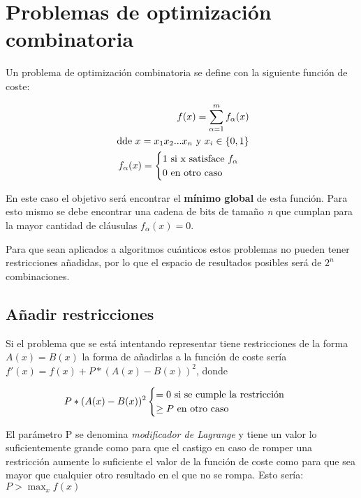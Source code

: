 \section{Problemas de optimización combinatoria}
\label{sec:3-problemas de optimizacion combinatoria}

Un problema de optimización combinatoria se define con la siguiente función de coste:

\begin{align*}
  f(x) = \sum_{\alpha = 1}^{m} f_\alpha(x) \\
  \textnormal{ dde } x = x_1x_2...x_n \textnormal{ y } x_i\in{\{0, 1\}} \\
   f_{\alpha}(x) = \begin{cases}
     1 \textnormal{ si x satisface } f_\alpha \\
     0 \textnormal{ en otro caso}
   \end{cases}
\end{align*}

En este caso el objetivo será encontrar el \textbf{mínimo global} de esta función. Para esto mismo se debe encontrar una cadena de bits de tamaño \textit{n} que cumplan para la mayor cantidad de cláusulas $f_\alpha(x) = 0$.

Para que sean aplicados a algoritmos cuánticos estos problemas no pueden tener restricciones añadidas, por lo que el espacio de resultados posibles será de $2^n$ combinaciones.

\subsection{Añadir restricciones}

Si el problema que se está intentando representar tiene restricciones de la forma $A(x) = B(x)$ la forma de añadirlas a la función de coste sería $f'(x) = f(x) + P*(A(x)-B(x))^2$, donde

\begin{align*}
  P*(A(x) - B(x))^2 \begin{cases}
    = 0 \textnormal{ si se cumple la restricción } \\
    \ge P \textnormal{ en otro caso }
  \end{cases}
\end{align*}

El parámetro P se denomina \textit{modificador de Lagrange} y tiene un valor lo suficientemente grande como para que el castigo en caso de romper una restricción aumente lo suficiente el valor de la función de coste como para que sea mayor que cualquier otro resultado en el que no se rompa. Esto sería: $P > \max_xf(x)$

